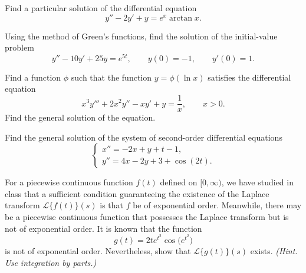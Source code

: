 \begin{problem}
Find a particular solution of the differential equation
\[
y''-2y'+y=e^x\arctan x.
\]
\end{problem}

\begin{problem}
Using the method of Green's functions, find the solution of the initial-value problem
\[
y''-10y'+25y=e^{5t},
\qquad
y(0)=-1,
\qquad
y'(0)=1.
\]
\end{problem}

\begin{problem}
Find a function $\phi$ such that the function $y=\phi(\ln x)$ satisfies the differential equation
\[
x^3y'''+2x^2y''-xy'+y=\frac{1}{x},
\qquad x>0.
\]
Find the general solution of the equation.
\end{problem}

\begin{problem}
Find the general solution of the system of second-order differential equations
\[
\begin{cases}
x''=-2x+y+t-1,\\
y''=4x-2y+3+\cos(2t).
\end{cases}
\]
\end{problem}

\begin{problem}
For a piecewise continuous function $f(t)$ defined on $[0,\infty)$, we have studied in class that a sufficient condition guaranteeing the existence of the Laplace transform $\mathcal{L}\{f(t)\}(s)$ is that $f$ be of exponential order. Meanwhile, there may be a piecewise continuous function that possesses the Laplace transform but is not of exponential order. It is known that the function
\[
g(t)=2te^{t^2}\cos\bigl(e^{t^2}\bigr)
\]
is not of exponential order. Nevertheless, show that $\mathcal{L}\{g(t)\}(s)$ exists. \textit{(Hint. Use integration by parts.)}
\end{problem}

